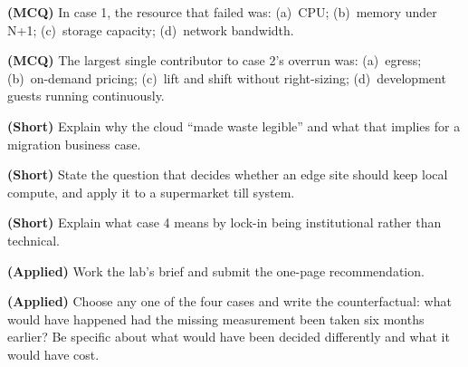 \begin{reviewq}
  \item \textbf{(MCQ)} In case 1, the resource that failed was: (a)~CPU;
        (b)~memory under N+1; (c)~storage capacity; (d)~network bandwidth.
  \item \textbf{(MCQ)} The largest single contributor to case 2's overrun was:
        (a)~egress; (b)~on-demand pricing; (c)~lift and shift without
        right-sizing; (d)~development guests running continuously.
  \item \textbf{(Short)} Explain why the cloud ``made waste legible'' and what
        that implies for a migration business case.
  \item \textbf{(Short)} State the question that decides whether an edge site
        should keep local compute, and apply it to a supermarket till system.
  \item \textbf{(Short)} Explain what case 4 means by lock-in being
        institutional rather than technical.
  \item \textbf{(Applied)} Work the lab's brief and submit the one-page
        recommendation.
  \item \textbf{(Applied)} Choose any one of the four cases and write the
        counterfactual: what would have happened had the missing measurement
        been taken six months earlier? Be specific about what would have been
        decided differently and what it would have cost.
\end{reviewq}
